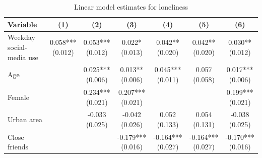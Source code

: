 \begin{table}[!htbp]
\centering
\caption{Linear model estimates for loneliness}
\label{tab:linear_models_loneliness}
\scriptsize
\setlength{\tabcolsep}{3.2pt}
\renewcommand{\arraystretch}{0.9}
\begin{tabular}{p{}cccccc}
\hline
Variable & (1) & (2) & (3) & (4) & (5) & (6) \\
\hline
Weekday social-media use & \shortstack[c]{0.058*** \\[-0.35ex] (0.012)} & \shortstack[c]{0.053*** \\[-0.35ex] (0.012)} & \shortstack[c]{0.022* \\[-0.35ex] (0.013)} & \shortstack[c]{0.042** \\[-0.35ex] (0.020)} & \shortstack[c]{0.042** \\[-0.35ex] (0.020)} & \shortstack[c]{0.030** \\[-0.35ex] (0.012)}
\\
Age &  & \shortstack[c]{0.025*** \\[-0.35ex] (0.006)} & \shortstack[c]{0.013** \\[-0.35ex] (0.006)} & \shortstack[c]{0.045*** \\[-0.35ex] (0.011)} & \shortstack[c]{0.057 \\[-0.35ex] (0.058)} & \shortstack[c]{0.017*** \\[-0.35ex] (0.006)}
\\
Female &  & \shortstack[c]{0.234*** \\[-0.35ex] (0.021)} & \shortstack[c]{0.207*** \\[-0.35ex] (0.021)} &  &  & \shortstack[c]{0.199*** \\[-0.35ex] (0.021)}
\\
Urban area &  & \shortstack[c]{-0.033 \\[-0.35ex] (0.025)} & \shortstack[c]{-0.042 \\[-0.35ex] (0.026)} & \shortstack[c]{0.052 \\[-0.35ex] (0.133)} & \shortstack[c]{0.054 \\[-0.35ex] (0.131)} & \shortstack[c]{-0.038 \\[-0.35ex] (0.025)}
\\
Close friends &  &  & \shortstack[c]{-0.179*** \\[-0.35ex] (0.016)} & \shortstack[c]{-0.164*** \\[-0.35ex] (0.027)} & \shortstack[c]{-0.164*** \\[-0.35ex] (0.027)} & \shortstack[c]{-0.170*** \\[-0.35ex] (0.016)}

\end{tabular}
\end{table}
